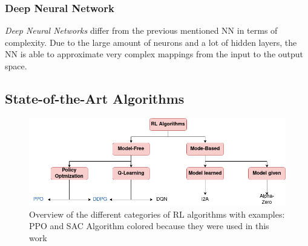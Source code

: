 \subsubsection{Deep Neural Network}
\emph{Deep Neural Networks} differ from the previous mentioned NN in terms of complexity. 
Due to the large amount of neurons and a lot of hidden layers, the NN is able to approximate very complex mappings from the input to the output space.


\subsection{State-of-the-Art Algorithms}
\begin{figure}
	\centering
	\includegraphics[width=\linewidth]{figures/algo.png}
	\caption{Overview of the different categories of RL algorithms with examples: PPO and SAC Algorithm colored because they were used in this work}
	\label{fig:algo}
\end{figure}

